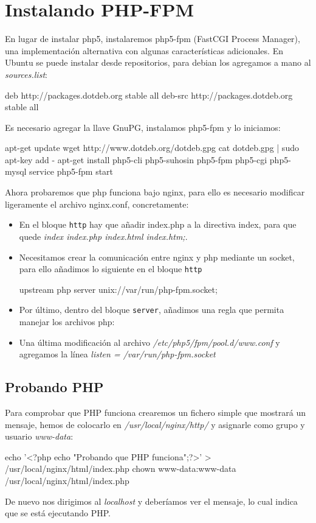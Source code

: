 \section{Instalando PHP-FPM}
En lugar de instalar php5, instalaremos php5-fpm (FastCGI Process Manager),
una implementación alternativa con algunas características adicionales. En
Ubuntu se puede instalar desde repositorios, para debian los agregamos a mano
al \emph{sources.list}:
\begin{bashcode}
deb http://packages.dotdeb.org stable all
deb-src http://packages.dotdeb.org stable all
\end{bashcode}
Es necesario agregar la llave GnuPG, instalamos php5-fpm y lo iniciamos:
\begin{bashcode}
apt-get update
wget http://www.dotdeb.org/dotdeb.gpg
cat dotdeb.gpg | sudo apt-key add -
apt-get install php5-cli php5-suhosin php5-fpm php5-cgi php5-mysql
service php5-fpm start
\end{bashcode}
Ahora probaremos que php funciona bajo nginx, para ello es necesario modificar
ligeramente el archivo nginx.conf, concretamente:
\begin{itemize}
    \item En el bloque \verb!http!  hay que añadir index.php a la directiva
    index, para que quede \emph{index index.php index.html index.htm;}.
    \item Necesitamos crear la comunicación entre nginx y php mediante un
    socket, para ello añadimos lo siguiente en el bloque \verb!http!
        \begin{bashcode}
upstream php {
    server unix://var/run/php-fpm.socket;
}
        \end{bashcode}
    \item Por último, dentro del bloque \verb!server!, añadimos una regla
    que permita manejar los archivos php:
    \item Una última modificación al archivo \emph{/etc/php5/fpm/pool.d/www.conf}
    y agregamos la línea \emph{listen = /var/run/php-fpm.socket}
\end{itemize}
\subsection{Probando PHP}
Para comprobar que PHP funciona crearemos un fichero simple que mostrará un
mensaje, hemos de colocarlo en \emph{/usr/local/nginx/http/} y asignarle como
grupo y usuario \emph{www-data}:
\begin{bashcode}
echo '<?php echo "Probando que PHP funciona";?>' > /usr/local/nginx/html/index.php
chown www-data:www-data /usr/local/nginx/html/index.php
\end{bashcode}
De nuevo nos dirigimos al \emph{localhost} y deberíamos ver el mensaje, lo
cual indica que se está ejecutando PHP.

